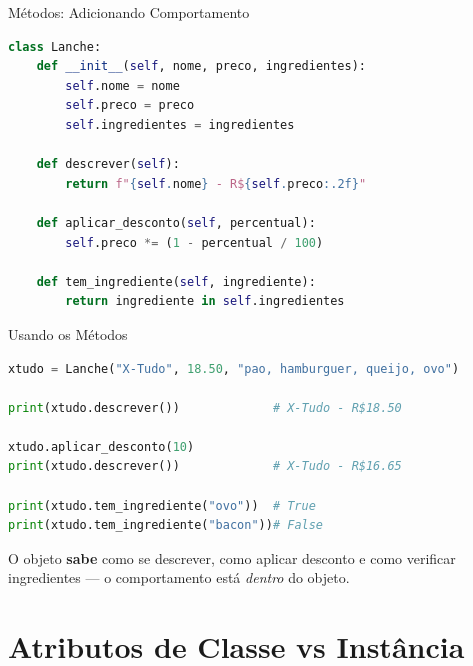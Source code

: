 \documentclass[aspectratio=169]{beamer}
\begin{document}
\begin{frame}{Métodos: Adicionando Comportamento}
  \begin{lstlisting}[language=Python]
class Lanche:
    def __init__(self, nome, preco, ingredientes):
        self.nome = nome
        self.preco = preco
        self.ingredientes = ingredientes

    def descrever(self):
        return f"{self.nome} - R${self.preco:.2f}"

    def aplicar_desconto(self, percentual):
        self.preco *= (1 - percentual / 100)

    def tem_ingrediente(self, ingrediente):
        return ingrediente in self.ingredientes
  \end{lstlisting}
\end{frame}

\begin{frame}[fragile]{Usando os Métodos}
  \begin{lstlisting}[language=Python]
xtudo = Lanche("X-Tudo", 18.50, "pao, hamburguer, queijo, ovo")

print(xtudo.descrever())             # X-Tudo - R$18.50

xtudo.aplicar_desconto(10)
print(xtudo.descrever())             # X-Tudo - R$16.65

print(xtudo.tem_ingrediente("ovo"))  # True
print(xtudo.tem_ingrediente("bacon"))# False
  \end{lstlisting}

  \vspace{0.3cm}
  O objeto \textbf{sabe} como se descrever, como aplicar desconto
  e como verificar ingredientes --- o comportamento está \emph{dentro} do objeto.
\end{frame}

\section{Atributos de Classe vs Instância}
\end{document}
